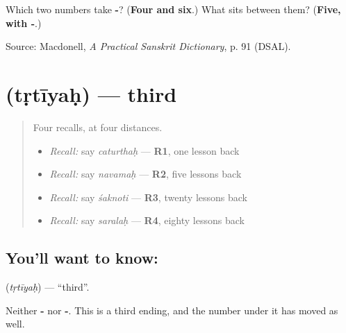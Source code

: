 \begin{tcolorbox}[breakable,colback=teal!4,colframe=teal!35!black,title={Before you move on}]
Which two numbers take \textbf{-}? (\textbf{Four and six}.) What sits between them? (\textbf{Five, with -}.)

Source: Macdonell, \emph{A Practical Sanskrit Dictionary}, p. 91 (DSAL).
\end{tcolorbox}
\section[\texorpdfstring{\sk{तृतीयः} (tṛtīyaḥ)}{तृतीयः (tṛtīyaḥ)}]{ (tṛtīyaḥ) — third}

\label{lesson:SA-C63-third}



\begin{quote}
Four recalls, at four distances.

\begin{itemize}
\raggedright
  \item \emph{Recall:} say \emph{caturthaḥ} — \textbf{R1}, one lesson back
  \item \emph{Recall:} say \emph{navamaḥ} — \textbf{R2}, five lessons back
  \item \emph{Recall:} say \emph{śaknoti} — \textbf{R3}, twenty lessons back
  \item \emph{Recall:} say \emph{saralaḥ} — \textbf{R4}, eighty lessons back
\end{itemize}
\end{quote}

\subsection*{You'll want to know: }
\textbf{} (\emph{tṛtīyaḥ}) — \textquotedblleft{}third\textquotedblright{}.

Neither \textbf{-} nor \textbf{-}. This is a third ending, and the number under it has moved as well.

